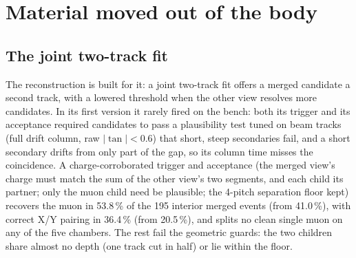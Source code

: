 \section{Material moved out of the body}\label{app:moved}

\subsection{The joint two-track fit}
The reconstruction is built for it: a joint two-track fit offers a merged
candidate a second track, with a lowered threshold when the other view resolves more candidates. In its first version
it rarely fired on the bench: both its trigger and its acceptance required candidates to pass a plausibility test tuned
on beam tracks (full drift column, raw $|\tan|<0.6$) that short, steep secondaries fail, and a short secondary drifts from
only part of the gap, so its column time misses the coincidence. A charge-corroborated trigger and acceptance (the
merged view's charge must match the sum of the other view's two segments, and each child its partner; only the muon
child need be plausible; the 4-pitch separation floor kept) recovers the muon in 53.8\,\% of the 195 interior merged
events (from 41.0\,\%), with correct X/Y pairing in 36.4\,\% (from 20.5\,\%), and splits no clean single muon on any of the
five chambers. The rest fail the geometric guards:
the two children share almost no depth (one track cut in half) or lie within the floor.

